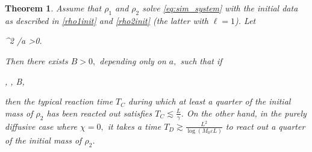 \documentclass[12pt,reqno]{amsart}
\newtheorem{theorem}{Theorem}[section]
\begin{document}
\begin{theorem}
Assume that $\rho_1$ and $\rho_2$ solve \eqref{eq:sim_system} with the initial data as described in \eqref{rho1init} and \eqref{rho2init} (the latter with $\ell=1$).
Let \begin{imaths}
\chi^2 \sigma /\varepsilon \geq a >0.
\end{imaths}
Then there exists $B>0,$ depending only on $a,$ such that if
\begin{imaths}
, \gamma,  \geq B,
\end{imaths}
then
the typical reaction time $T_C$ during which at least a quarter of the initial mass of $\rho_2$ has been reacted out satisfies $T_C\lesssim\frac{L}{\gamma}$. On the other hand, in the purely diffusive case where $\chi=0,$
it takes a time $T_D\gtrsim \frac{L^2}{\log(M_0\varepsilon L)}$ to react out a quarter of the initial mass of $\rho_2$.
\end{theorem}
\end{document}
